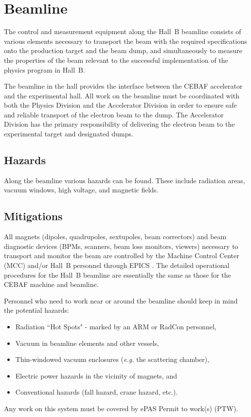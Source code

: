 \section{Beamline}

The control and measurement equipment along the Hall~B beamline consists of various 
elements necessary to transport the beam with the required specifications onto the 
production target and the beam dump, and simultaneously to measure the properties of 
the beam relevant to the successful implementation of the physics program in Hall~B. 

The beamline in the hall provides the interface between the CEBAF accelerator and the 
experimental hall. All work on the beamline must be coordinated with both the Physics 
Division and the Accelerator Division in order to ensure safe and reliable transport of 
the electron beam to the dump. The Accelerator Division has the primary responsibility 
of delivering the electron beam to the experimental target and designated dumps.

\subsection{Hazards} 

Along the beamline various hazards can be found. These include radiation areas, vacuum 
windows, high voltage, and magnetic fields.

\subsection{Mitigations}

All magnets (dipoles, quadrupoles, sextupoles, beam correctors) and beam diagnostic devices 
(BPMs, scanners, beam loss monitors, viewers) necessary to transport and monitor the beam 
are controlled by the Machine Control Center (MCC) and/or Hall~B personnel through EPICS 
\cite{epics}. The detailed operational procedures for the Hall~B beamline are essentially 
the same as those for the CEBAF machine and beamline.

Personnel who need to work near or around the beamline should keep in mind the potential 
hazards:
\begin{itemize}
\item Radiation ``Hot Spots" - marked by an ARM or RadCon personnel,
\item Vacuum in beamline elements and other vessels,
\item Thin-windowed vacuum enclosures ({\it e.g.} the scattering chamber),
\item Electric power hazards in the vicinity of magnets, and 
\item Conventional hazards (fall hazard, crane hazard, etc.). 
\end{itemize} 
Any work on this system must be covered by ePAS Permit to work(s) (PTW).

